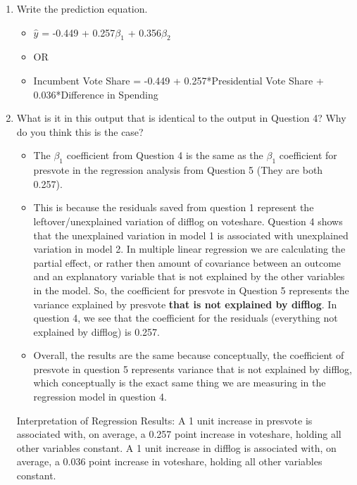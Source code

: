 \documentclass[12pt,letterpaper]{article}
\begin{document}
\begin{enumerate}
		\item Write the prediction equation.
		
		
\begin{itemize}
	\item  $\hat{y}$ = -0.449 + 0.257$\beta_1$ + 0.356$\beta_2$
	\item OR
	\item Incumbent Vote Share = -0.449 +  0.257*Presidential Vote Share + 0.036*Difference in Spending
	
\end{itemize}
		

		\item What is it in this output that is identical to the output in Question 4? Why do you think this is the case?
		
\begin{itemize}
	\item The $\beta_1$ coefficient from Question 4 is the same as the $\beta_1$ coefficient for presvote in the regression analysis from Question 5 (They are both 0.257).
	\item This is because the residuals saved from question 1 represent the leftover/unexplained variation of difflog on voteshare. Question 4 shows that the unexplained variation in model 1 is associated with unexplained variation in model 2. In multiple linear regression we are calculating the partial effect, or rather then amount of covariance between an outcome and an explanatory variable that is not explained by the other variables in the model. So, the coefficient for presvote in Question 5 represents the variance explained by presvote \textbf{that is not explained by difflog}. In question 4, we see that the coefficient for the residuals (everything not explained by difflog) is 0.257.
	\item Overall, the results are the same because conceptually, the coefficient of presvote in question 5 represents variance that is not explained by difflog, which conceptually is the exact same thing we are measuring in the regression model in question 4.
\end{itemize}	

\begin{flushleft}Interpretation of Regression Results: A 1 unit increase in presvote is associated with, on average, a 0.257 point increase in voteshare, holding all other variables constant. A 1 unit increase in difflog is associated with, on average, a 0.036 point increase in voteshare, holding all other variables constant.
\end{flushleft}


\end{enumerate}
\end{document}
